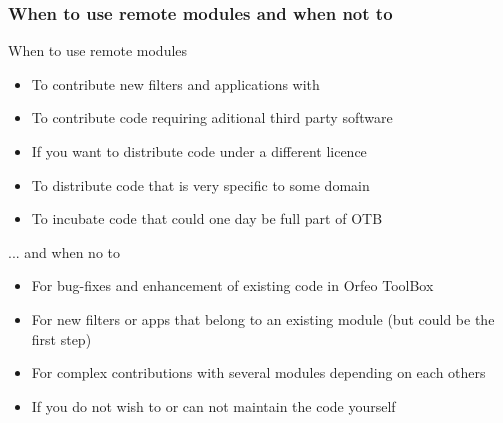 \documentclass[8pt]{beamer}
\begin{document}
\begin{frame}
\frametitle{When to use remote modules and when not to}

\begin{block}{When to use remote modules}
\begin{itemize}
\item To contribute new filters and applications with
\item To contribute code requiring aditional third party software
\item If you want to distribute code under a different licence
\item To distribute code that is very specific to some domain
\item To incubate code that could one day be full part of OTB
\end{itemize}
\end{block}

\begin{block}{... and when no to}
\begin{itemize}
\item For bug-fixes and enhancement of existing code in Orfeo ToolBox
\item For new filters or apps that belong to an existing module (but could be the first step)
\item For complex contributions with several modules depending on each others
\item If you do not wish to or can not maintain the code yourself
\end{itemize}
\end{block}

\end{frame}
\end{document}
